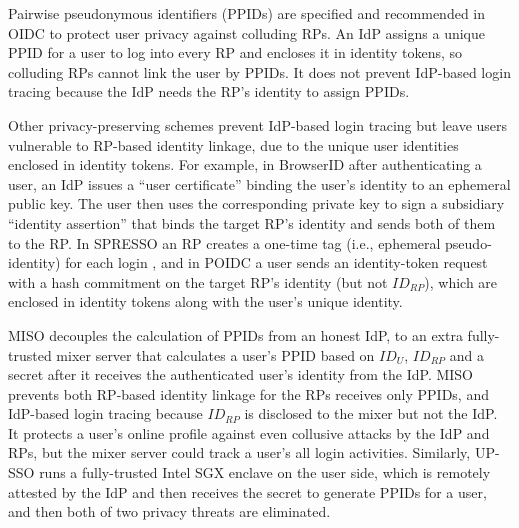 Pairwise pseudonymous identifiers (PPIDs) are specified \cite{OpenIDConnect, SAMLIdentifier} and recommended \cite{NIST2017draft} in OIDC to protect user privacy against colluding RPs.
An IdP assigns a unique PPID for a user to log into every RP and encloses it in identity tokens, so colluding RPs cannot link the user by PPIDs.
It does not prevent IdP-based login tracing because the IdP needs the RP's identity to assign PPIDs.

Other privacy-preserving schemes prevent IdP-based login tracing but leave users vulnerable to RP-based identity linkage, due to the unique user identities enclosed in identity tokens.
For example, in BrowserID \cite{BrowserID} 
after authenticating a user,
    an IdP %
issues a ``user certificate'' binding the user's identity to an ephemeral public key.
The user then uses the corresponding private key to sign a subsidiary ``identity assertion'' that binds the target RP's identity and sends both of them to the RP.
In SPRESSO an RP creates a one-time tag (i.e., ephemeral pseudo-identity) for each login \cite{SPRESSO},
 and in POIDC \cite{POIDC,save-flow} a user sends an identity-token request with a hash commitment on the target RP's identity (but not $ID_{RP}$),
        which are enclosed in identity tokens along with the user's unique identity.


MISO \cite{miso} decouples the calculation of PPIDs from an honest IdP,
 to an extra fully-trusted mixer server that calculates a user's PPID based on $ID_U$, $ID_{RP}$ and a secret after it receives the authenticated user's identity from the IdP.
MISO prevents both RP-based identity linkage for the RPs receives only PPIDs,
    and IdP-based login tracing because $ID_{RP}$ is disclosed to the mixer but not the IdP.
It protects a user's online profile against even collusive attacks by the IdP and RPs,
    but the mixer server could track a user's all login activities.
Similarly, UP-SSO \cite{up-sso} runs a fully-trusted Intel SGX enclave on the user side,
 which is remotely attested by the IdP and then receives the secret to generate PPIDs for a user, and then both of two privacy threats are eliminated.

